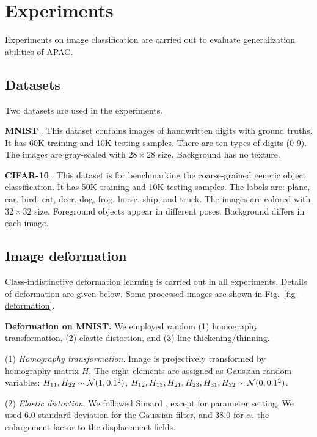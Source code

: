 \documentclass[10pt,twocolumn,letterpaper]{article}
\begin{document}
\section{Experiments}

Experiments on image classification are carried out to 
evaluate generalization abilities of APAC.


\subsection{Datasets}

Two datasets are used in the experiments.

{\bf MNIST} \cite{lecun-98h}. 
This dataset contains images of handwritten digits with ground truths.
It has 60K training and 10K testing samples.
There are ten types of digits (0-9).
The images are gray-scaled with $28 \times 28$ size.
Background has no texture.

{\bf CIFAR-10} \cite{KrizhevskyMasterThesis}.
This dataset is for benchmarking the 
coarse-grained generic object classification.
It has 50K training and 10K testing samples.
The labels are: plane, car, bird, cat, deer, dog, frog,
horse, ship, and truck.
The images are colored with $32\times 32$ size.
Foreground objects appear in different poses.
Background differs in each image.

\subsection{Image deformation}

Class-indistinctive deformation learning is carried out in all experiments.
Details of deformation are given below.
Some processed images are shown in Fig.~\ref{fig-deformation}.

{\bf Deformation on MNIST.}
We employed random (1) homography transformation, (2) elastic distortion, and (3) line thickening/thinning.


\noindent
(1) {\it Homography transformation}.
Image is projectively transformed by homography matrix $H$.
The eight elements are assigned as Gaussian random variables:
$H_{11}, H_{22} \sim {\cal N}(1, 0.1^2)$,
$H_{12}, H_{13}, H_{21}, H_{23}, H_{31}, H_{32} \sim 
{\cal N}(0, 0.1^2)$.

\noindent
(2) {\it Elastic distortion}.
We followed Simard \etal \cite{Simard03j.c.:best}, 
except for parameter setting.
We used 6.0 standard deviation for the Gaussian filter,
and 38.0 for $\alpha$, the enlargement factor to the displacement fields.
\end{document}
